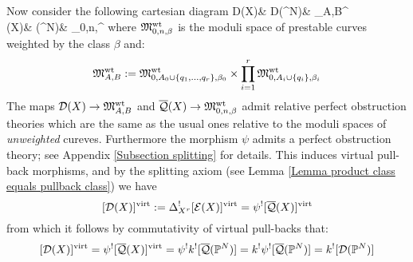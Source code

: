 Now consider the following cartesian diagram
\bcd
\mathcal D(X)\ar[r]\ar[d,"\varphi_X"] & \mathcal D(\PP^N)\ar[r]\ar[d,"\varphi_{\PP^N}"] & \MM_{A,B}^{}\ar[d,"\psi"] \\
(X)\ar[r,"k"] & (\PP^N)\ar[r] & \MM_{0,n,\beta}^{}
\ecd
where $\mathfrak M_{0,n,\beta}^{\operatorname{wt}}$ is the moduli space of prestable curves weighted by the class $\beta$ \cite[\S 2]{Costello} and:
\begin{equation*} \mathfrak M_{A,B}^{\operatorname{wt}} := \mathfrak M_{0,A_0 \cup \{ q_1, \ldots, q_r \}, \beta_0}^{\operatorname{wt}} \times \prod_{i=1}^r \mathfrak M_{0,A_i \cup \{ q_i \},\beta_i}^{\operatorname{wt}} \end{equation*}
The maps $\mathcal{D}(X) \rightarrow \mathfrak M_{A,B}^{\operatorname{wt}}$ and $\overline{\mathcal{Q}}(X) \rightarrow \mathfrak M_{0,n,\beta}^{\operatorname{wt}}$ admit relative perfect obstruction theories which are the same as the usual ones relative to the moduli spaces of \emph{unweighted} cureves. Furthermore the morphism $\psi$ admits a perfect obstruction theory; see Appendix \ref{Subsection splitting} for details. This induces virtual pull-back morphisms, and by the splitting axiom (see Lemma \ref{Lemma product class equals pullback class}) we have
\begin{equation*} [\mathcal{D}(X)]^{\operatorname{virt}} := \Delta_{X^r}^! [\mathcal{E}(X)]^{\operatorname{virt}} = \psi^! [\overline{\mathcal{Q}}(X)]^{\operatorname{virt}} \end{equation*}
from which it follows by commutativity of virtual pull-backs that:
\begin{equation} [\mathcal{D}(X)]^{\operatorname{virt}} = \label{psishriek formula} \psi^![\overline{\mathcal{Q}}(X)]^{\operatorname{virt}}= \psi^! k^! [ \overline{\mathcal{Q}}(\mathbb P^N)] = k^!\psi^![\overline{\mathcal{Q}}(\mathbb P^N)] = k^! [ \mathcal{D}(\mathbb P^N) ]\end{equation}

